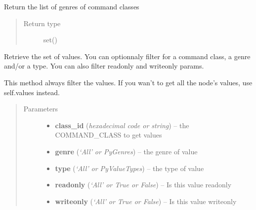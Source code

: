 \documentclass[letterpaper,10pt,english]{sphinxmanual}
\begin{document}
\begin{fulllineitems}
\begin{fulllineitems}
\end{fulllineitems}


\begin{fulllineitems}
\label{node:openzwave.node.ZWaveNode.get_command_class_genres}
Return the list of genres of command classes
\begin{quote}\begin{description}
\item[{Return type}] \leavevmode
set()

\end{description}\end{quote}

\end{fulllineitems}


\begin{fulllineitems}
\label{node:openzwave.node.ZWaveNode.get_values}
Retrieve the set of values. You can optionnaly filter for a command class,
a genre and/or a type. You can also filter readonly and writeonly params.

This method always filter the values.
If you wan't to get all the node's values, use self.values instead.
\begin{quote}\begin{description}
\item[{Parameters}] \leavevmode\begin{itemize}
\item {} 
\textbf{class\_id} (\emph{hexadecimal code or string}) -- the COMMAND\_CLASS to get values

\item {} 
\textbf{genre} (\emph{`All' or PyGenres}) -- the genre of value

\item {} 
\textbf{type} (\emph{`All' or PyValueTypes}) -- the type of value

\item {} 
\textbf{readonly} (\emph{`All' or True or False}) -- Is this value readonly

\item {} 
\textbf{writeonly} (\emph{`All' or True or False}) -- Is this value writeonly


\end{itemize}
\end{description}
\end{quote}
\end{fulllineitems}
\end{fulllineitems}
\end{document}
